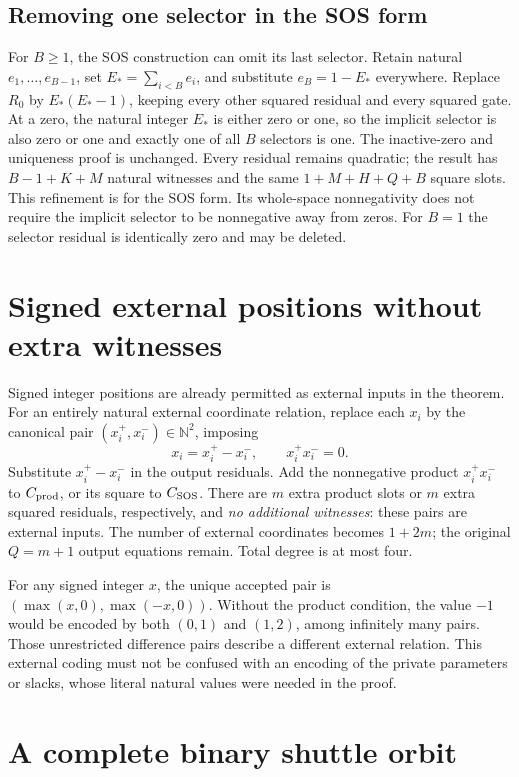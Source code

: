 \documentclass[11pt,letterpaper]{article}
\numberwithin{equation}{section}
\theoremstyle{definition}
\theoremstyle{remark}
\newcommand{\NN}{\mathbb N}
\begin{document}
\subsection{Removing one selector in the SOS form}
For $B\ge1$, the SOS construction can omit its last selector. Retain natural
$e_1,\ldots,e_{B-1}$, set $E_*=\sum_{i<B}e_i$, and substitute
$e_B=1-E_*$ everywhere. Replace $R_0$ by $E_*(E_*-1)$, keeping every other
squared residual and every squared gate. At a zero, the natural integer
$E_*$ is either zero or one, so the implicit selector is also zero or one
and exactly one of all $B$ selectors is one. The inactive-zero and
uniqueness proof is unchanged. Every residual remains quadratic; the result
has $B-1+K+M$ natural witnesses and the same $1+M+H+Q+B$ square slots.
This refinement is for the SOS form. Its whole-space nonnegativity does not
require the implicit selector to be nonnegative away from zeros. For $B=1$
the selector residual is identically zero and may be deleted.

\section{Signed external positions without extra witnesses}\label{smc:tq:sec:signed}
Signed integer positions are already permitted as external inputs in the
theorem. For an entirely natural external coordinate relation, replace each
$x_i$ by the canonical pair $(x_i^+,x_i^-)\in\NN^2$, imposing
\[
 x_i=x_i^+-x_i^-,\qquad x_i^+x_i^-=0.
\]
Substitute $x_i^+-x_i^-$ in the output residuals. Add the nonnegative
product $x_i^+x_i^-$ to $C_{\rm prod}$, or its square to $C_{\rm SOS}$.
There are $m$ extra product slots or $m$ extra squared residuals,
respectively, and \emph{no additional witnesses}: these pairs are external
inputs. The number of external coordinates becomes $1+2m$; the original
$Q=m+1$ output equations remain. Total degree is at most four.

For any signed integer $x$, the unique accepted pair is
$(\max(x,0),\max(-x,0))$. Without the product condition, the value $-1$
would be encoded by both $(0,1)$ and $(1,2)$, among infinitely many pairs.
Those unrestricted difference pairs describe a different external relation.
This external coding must not be confused with an encoding of the private
parameters or slacks, whose literal natural values were needed in the proof.

\section{A complete binary shuttle orbit}\label{smc:tq:sec:binary}
\end{document}
